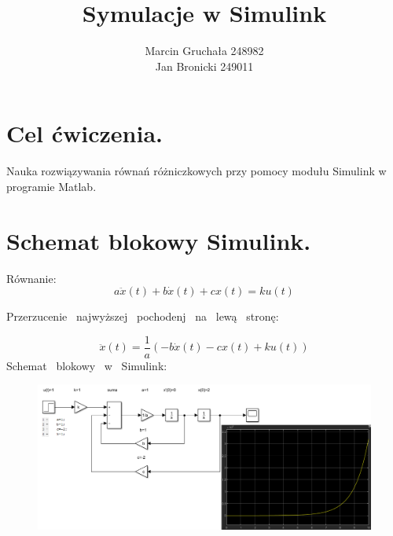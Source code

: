 \documentclass{article}
\title{Symulacje w Simulink}
\author{Marcin Gruchała 248982\\
Jan Bronicki 249011\\}
\date{}
\begin{document}
\maketitle
\section{Cel ćwiczenia.}
Nauka rozwiązywania równań różniczkowych przy pomocy modułu Simulink w programie Matlab.  
\section{Schemat blokowy Simulink.}
Równanie:
$$
 a\ddot{x}(t)+b\dot{x}(t)+cx(t)=ku(t)
$$
\begin{flushleft}
    Przerzucenie \ najwyższej \ pochodenj \ na \ lewą \ stronę:
\end{flushleft}
$$
\ddot{x}(t)=\frac{1}{a}(-b\dot{x}(t)-cx(t)+ku(t))
$$
Schemat \ blokowy \ w \ Simulink:
\begin{figure}[h!]
    \centering
    \includegraphics[width=1\textwidth]{uklad.png}
    \label{fig:my_label}
\end{figure}

\newpage
\end{document}
